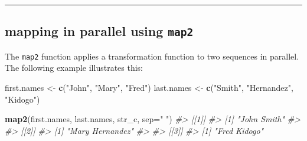 \documentclass[]{book}
\newenvironment{Shaded}{\begin{snugshade}}{\end{snugshade}}
\newcommand{\CommentTok}[1]{\textcolor[rgb]{0.56,0.35,0.01}{\textit{#1}}}
\newcommand{\DataTypeTok}[1]{\textcolor[rgb]{0.13,0.29,0.53}{#1}}
\newcommand{\KeywordTok}[1]{\textcolor[rgb]{0.13,0.29,0.53}{\textbf{#1}}}
\newcommand{\NormalTok}[1]{#1}
\newcommand{\OperatorTok}[1]{\textcolor[rgb]{0.81,0.36,0.00}{\textbf{#1}}}
\newcommand{\StringTok}[1]{\textcolor[rgb]{0.31,0.60,0.02}{#1}}
\theoremstyle{definition}
\theoremstyle{definition}
\theoremstyle{definition}
\theoremstyle{remark}
\begin{document}
\begin{Shaded}
\end{Shaded}

\begin{center}\rule{0.5\linewidth}{\linethickness}\end{center}

\hypertarget{mapping-in-parallel-using-map2}{%
\subsection{\texorpdfstring{mapping in parallel using
\texttt{map2}}{mapping in parallel using map2}}\label{mapping-in-parallel-using-map2}}

The \texttt{map2} function applies a transformation function to two
sequences in parallel. The following example illustrates this:

\begin{Shaded}
\begin{Highlighting}[]
\NormalTok{first.names <-}\StringTok{ }\KeywordTok{c}\NormalTok{(}\StringTok{"John"}\NormalTok{, }\StringTok{"Mary"}\NormalTok{, }\StringTok{"Fred"}\NormalTok{)}
\NormalTok{last.names <-}\StringTok{ }\KeywordTok{c}\NormalTok{(}\StringTok{"Smith"}\NormalTok{, }\StringTok{"Hernandez"}\NormalTok{, }\StringTok{"Kidogo"}\NormalTok{)}

\KeywordTok{map2}\NormalTok{(first.names, last.names, str_c, }\DataTypeTok{sep=}\StringTok{" "}\NormalTok{)}
\CommentTok{#> [[1]]}
\CommentTok{#> [1] "John Smith"}
\CommentTok{#> }
\CommentTok{#> [[2]]}
\CommentTok{#> [1] "Mary Hernandez"}
\CommentTok{#> }
\CommentTok{#> [[3]]}
\CommentTok{#> [1] "Fred Kidogo"}
\end{Highlighting}
\end{Shaded}
\end{document}
